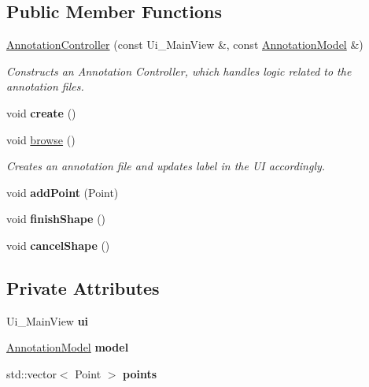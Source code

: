 \subsection*{Public Member Functions}
\begin{DoxyCompactItemize}
\item 
\hyperlink{classAnnotationController_a28cad1eb39c829d54093a965f59cdb2e}{Annotation\+Controller} (const Ui\+\_\+\+Main\+View \&, const \hyperlink{classAnnotationModel}{Annotation\+Model} \&)
\begin{DoxyCompactList}\small\item\em Constructs an Annotation Controller, which handles logic related to the annotation files. \end{DoxyCompactList}\item 
\mbox{\label{classAnnotationController_a490f659b6a1b6f4740925871689f747b}} 
void {\bfseries create} ()
\item 
\mbox{\label{classAnnotationController_aa79d79caa93863d2676900cece4cc994}} 
void \hyperlink{classAnnotationController_aa79d79caa93863d2676900cece4cc994}{browse} ()
\begin{DoxyCompactList}\small\item\em Creates an annotation file and updates label in the UI accordingly. \end{DoxyCompactList}\item 
\mbox{\label{classAnnotationController_a03b1715610f84b203e7a5ded7046dcd2}} 
void {\bfseries add\+Point} (Point)
\item 
\mbox{\label{classAnnotationController_a295ef2113a2ef2201e736240e7a1078a}} 
void {\bfseries finish\+Shape} ()
\item 
\mbox{\label{classAnnotationController_aff95935a2215c4a52cbeb2674317d17d}} 
void {\bfseries cancel\+Shape} ()
\end{DoxyCompactItemize}
\subsection*{Private Attributes}
\begin{DoxyCompactItemize}
\item 
\mbox{\label{classAnnotationController_ad6db968693628859a69bab0667006dc1}} 
Ui\+\_\+\+Main\+View {\bfseries ui}
\item 
\mbox{\label{classAnnotationController_ac9fc70313798905bf9fca275edfda08e}} 
\hyperlink{classAnnotationModel}{Annotation\+Model} {\bfseries model}
\item 
\mbox{\label{classAnnotationController_aa4d49b736dedbd57d47c74ab3cef65cc}} 
std\+::vector$<$ Point $>$ {\bfseries points}
\end{DoxyCompactItemize}


